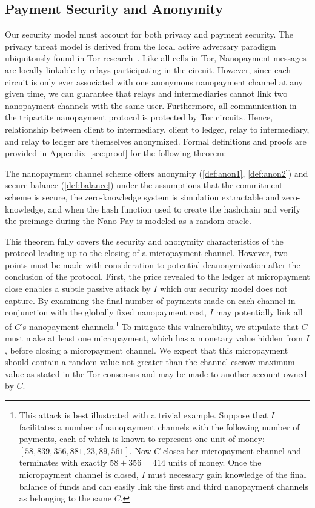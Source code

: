 \subsection{Payment Security and Anonymity} \label{subsec:paysecurity} Our security model must account for both privacy and payment security.
The privacy threat model is derived from the local active adversary paradigm ubiquitously found in Tor research~\cite{dingledine2004tor}.
Like all cells in Tor, Nanopayment messages are locally linkable by relays participating in the circuit.
However, since each circuit is only ever associated with one anonymous nanopayment channel at any given time, we can guarantee that relays and intermediaries cannot link two nanopayment channels with the same user.
Furthermore, all communication in the tripartite nanopayment protocol is protected by Tor circuits.
Hence, relationship between client to intermediary, client to ledger, relay to intermediary, and relay to ledger are themselves anonymized.
Formal definitions and proofs are provided in Appendix~\ref{sec:proof} for the following theorem:

\begin{theorem}

  The nanopayment channel scheme offers anonymity (\ref{def:anon1}, \ref{def:anon2}) and secure balance (\ref{def:balance}) under the assumptions that the commitment scheme is secure, the zero-knowledge system is simulation extractable and zero-knowledge, and when the hash function used to create the hashchain and verify the preimage during the Nano-Pay is modeled as a random oracle.

\end{theorem}

This theorem fully covers the security and anonymity characteristics of the protocol leading up to the closing of a micropayment channel.
However, two points must be made with consideration to potential deanonymization after the conclusion of the protocol.
First, the price revealed to the ledger at micropayment close enables a subtle passive attack by $I$ which our security model does not capture.
By examining the final number of payments made on each channel in conjunction with the globally fixed nanopayment cost, $I$ may potentially link all of $C$'s nanopayment channels.\footnote{This attack is best illustrated with a trivial example.
Suppose that $I$ facilitates a number of nanopayment channels with the following number of payments, each of which is known to represent one unit of money: $[58, 839, 356, 881, 23, 89, 561]$.
Now $C$ closes her micropayment channel and terminates with exactly $58 + 356 = 414$ units of money.
Once the micropayment channel is closed, $I$ must necessary gain knowledge of the final balance of funds and can easily link the first and third nanopayment channels as belonging to the same $C$.}
To mitigate this vulnerability, we stipulate that $C$ must make at least one micropayment, which has a monetary value hidden from $I$, before closing a micropayment channel.
We expect that this micropayment should contain a random value not greater than the channel escrow maximum value as stated in the Tor consensus and may be made to another account owned by $C$.

